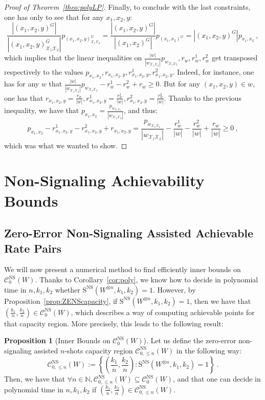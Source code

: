 \documentclass[11pt]{article}
\theoremstyle{definition}
\newtheorem{prop}[theo]{Proposition}
\theoremstyle{remark}
\begin{document}
\begin{proof}[Proof of Theorem~\ref{theo:polyLP}]
   Finally, to conclude with the last constraints, one has only to see that for any $x_1,x_2,y$:
   \[\frac{|(x_1,x_2,y)^G|}{|(x_1,x_2,y)^G_{\mathcal{X}_1\mathcal{X}_2}|}p_{(x_1,x_2,y)^G_{\mathcal{X}_1\mathcal{X}_2}} = \frac{|(x_1,x_2,y)^G|}{|(x_1,x_2)^G|}p_{(x_1,x_2)^G} = |(x_1,x_2,y)^G|p_{x_1,x_2}  \ ,\]
   which implies that the linear inequalities on $\frac{|w|}{|w_{\mathcal{X}_1\mathcal{X}_2}|} p_{w_{\mathcal{X}_1\mathcal{X}_2}}, r_w, r^1_w, r^2_w$ get transposed respectively to the values $p_{x_1,x_2}, r_{x_1,x_2,y}, r^1_{x_1,x_2,y}, r^2_{x_1,x_2,y}$. Indeed, for instance, one has for any $w$ that $\frac{|w|}{|w_{\mathcal{X}_1\mathcal{X}_2}|} p_{w_{\mathcal{X}_1\mathcal{X}_2}}- r^1_w - r^2_w + r_w \geq 0$. But for any $(x_1,x_2,y) \in w$, one has that $r_{x_1,x_2,y} = \frac{r_w}{|w|},r^1_{x_1,x_2,y} = \frac{r^1_w}{|w|},r^2_{x_1,x_2,y} = \frac{r^2_w}{|w|}$. Thanks to the previous inequality, we have that $p_{x_1,x_2}  = \frac{p_{w_{\mathcal{X}_1\mathcal{X}_2}}}{|w_{\mathcal{X}_1\mathcal{X}_2}|}$, and thus:
   \[p_{x_1,x_2}- r^1_{x_1,x_2,y}- r^2_{x_1,x_2,y} + r_{x_1,x_2,y} = \frac{p_{w_{\mathcal{X}_1\mathcal{X}_2}}}{|w_{\mathcal{X}_1\mathcal{X}_2}|} - \frac{r^1_w}{|w|} - \frac{r^2_w}{|w|} + \frac{r_w}{|w|} \geq 0 \ ,\]
   which was what we wanted to show.
\end{proof}
  
\section{Non-Signaling Achievability Bounds}
\label{section:IB}
\subsection{Zero-Error Non-Signaling Assisted Achievable Rate Pairs}
We will now present a numerical method to find efficiently inner bounds on $\mathcal{C}_0^{\mathrm{NS}}(W)$. Thanks to Corollary~\ref{cor:poly}, we know how to decide in polynomial time in $n,k_1,k_2$ whether $\mathrm{S}^{\mathrm{NS}}(W^{\otimes n},k_1,k_2)=1$. However, by Proposition~\ref{prop:ZENScapacity}, if $\mathrm{S}^{\mathrm{NS}}(W^{\otimes n},k_1,k_2)=1$, then we have that $\left(\frac{k_1}{n},\frac{k_2}{n}\right) \in \mathcal{C}_0^{\mathrm{NS}}(W)$, which describes a way of computing achievable points for that capacity region. More precisely, this leads to the following result:

\begin{prop}[Inner Bounds on $\mathcal{C}_0^{\mathrm{NS}}(W)$]
  \label{prop:IB}
  Let us define the zero-error non-signaling assisted $n$-shots capacity region $\mathcal{C}_{0,\leq n}^{\mathrm{NS}}(W)$ in the following way:
  \[ \mathcal{C}_{0,\leq n}^{\mathrm{NS}}(W)  := \left\{ \left(\frac{k_1}{n},\frac{k_2}{n}\right) : \mathrm{S}^{\mathrm{NS}}(W^{\otimes n},k_1,k_2)=1 \right\}\ . \]
  Then, we have that $\forall n \in \mathbb{N}, \mathcal{C}_{0,\leq n}^{\mathrm{NS}}(W) \subseteq \mathcal{C}_0^{\mathrm{NS}}(W)$, and that one can decide in polynomial time in $n,k_1,k_2$ if $\left(\frac{k_1}{n},\frac{k_2}{n}\right) \in \mathcal{C}_{0,\leq n}^{\mathrm{NS}}(W)$.
\end{prop}
\end{document}

